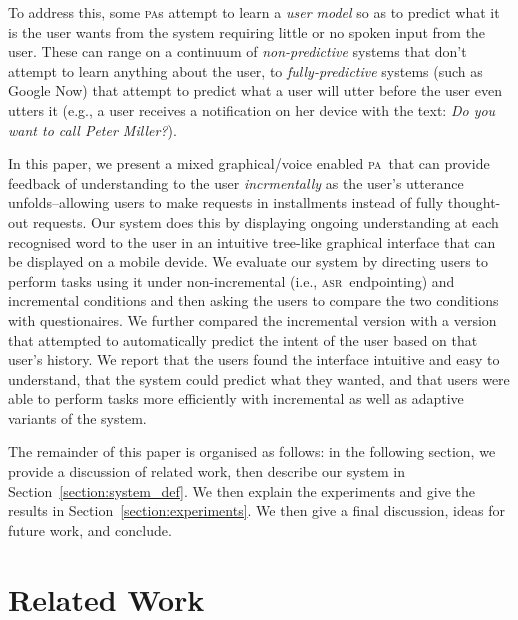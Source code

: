 \documentclass[11pt]{article}
\newcommand{\asr}[0]{\textsc{asr}}
\newcommand{\pa}[0]{\textsc{pa}}
\begin{document}
To address this, some \pa s attempt to learn a \emph{user model} so as to predict what it is the user wants from the system requiring little or no spoken input from the user. These can range on a continuum of \emph{non-predictive} systems that don't attempt to learn anything about the user, to \emph{fully-predictive} systems (such as Google Now) that attempt to predict what a user will utter before the user even utters it (e.g., a user receives a notification on her device with the text: \emph{Do you want to call Peter Miller?}). 

In this paper, we present a mixed graphical/voice enabled \pa\ that can provide feedback of understanding to the user \emph{incrmentally} as the user's utterance unfolds--allowing users to make requests in installments instead of fully thought-out requests. Our system does this by displaying ongoing understanding at each recognised word to the user in an intuitive tree-like graphical interface that can be displayed on a mobile devide. We evaluate our system by directing users to perform tasks using it under non-incremental (i.e., \asr\ endpointing) and incremental conditions and then asking the users to compare the two conditions with questionaires. We further compared the incremental version with a version that attempted to automatically predict the intent of the user based on that user's history. We report that the users found the interface intuitive and easy to understand, that the system could predict what they wanted, and that users were able to perform tasks more efficiently with incremental as well as adaptive variants of the system.

The remainder of this paper is organised as follows: in the following section, we provide a discussion of related work, then describe our system in Section~\ref{section:system_def}. We then explain the experiments and give the results in Section~\ref{section:experiments}. We then give a final discussion, ideas for future work, and conclude. 

\section{Related Work}
\label{section:related_work}
\end{document}
